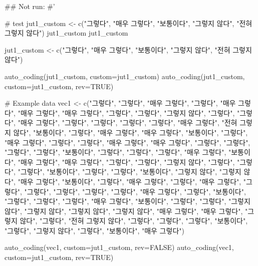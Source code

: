 \documentclass[a4paper]{book}
\begin{document}
\begin{Examples}
\begin{ExampleCode}

\#\# Not run: 
#'

# test
jut1_custom <- c("그렇다", "매우 그렇다", "보통이다",
                 "그렇지 않다", "전혀 그렇지 않다")
jut1_custom
jut1_custom%


jut1_custom <- c("그렇다", "매우 그렇다", "보통이다", "그렇지 않다", "전혀 그렇지 않다")

auto_coding(jut1_custom, custom=jut1_custom)
auto_coding(jut1_custom, custom=jut1_custom, rev=TRUE)


# Example data
vec1 <- c("그렇다", "그렇다", "매우 그렇다", "그렇다", "매우 그렇다", "매우 그렇다",
          "매우 그렇다", "그렇다", "그렇다", "그렇지 않다", "그렇다", "그렇다",
          "매우 그렇다", "그렇다", "그렇다", "그렇다", "그렇다", "매우 그렇다",
          "전혀 그렇지 않다", "보통이다", "그렇다", "매우 그렇다", "매우 그렇다",
          "보통이다", "그렇다", "매우 그렇다", "그렇다", "그렇다", "매우 그렇다",
          "매우 그렇다", "그렇다", "그렇다", "그렇다", "그렇다", "보통이다",
          "그렇다", "그렇다", "그렇다", "매우 그렇다", "보통이다", "매우 그렇다",
          "매우 그렇다", "그렇다", "그렇다", "그렇지 않다", "그렇다", "그렇다",
          "그렇다", "보통이다", "그렇다", "그렇다", "보통이다", "그렇지 않다",
          "그렇지 않다", "매우 그렇다", "보통이다", "그렇다", "매우 그렇다",
          "그렇다", "매우 그렇다", "그렇다", "그렇다", "그렇다", "그렇다",
          "그렇다", "매우 그렇다", "그렇다", "보통이다", "그렇다", "그렇다",
          "그렇다", "매우 그렇다", "보통이다", "그렇다", "그렇다", "그렇지 않다",
          "그렇지 않다", "그렇지 않다", "그렇지 않다", "매우 그렇다", "매우 그렇다",
          "그렇지 않다", "그렇다", "전혀 그렇지 않다", "그렇다", "그렇다",
          "그렇다", "보통이다", "그렇다", "그렇지 않다", "그렇다", "보통이다",
          "매우 그렇다")

auto_coding(vec1, custom=jut1_custom, rev=FALSE)
auto_coding(vec1, custom=jut1_custom, rev=TRUE)




\end{ExampleCode}
\end{Examples}
\end{document}
